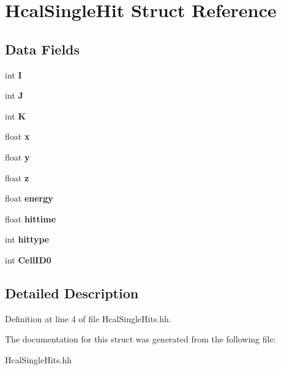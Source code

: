 \section{HcalSingleHit Struct Reference}
\label{structHcalSingleHit}
\subsection*{Data Fields}
\begin{DoxyCompactItemize}
\item 
int {\bfseries I}\label{structHcalSingleHit_ab8c785a4cf4d343ad7e107cbb4ef737d}

\item 
int {\bfseries J}\label{structHcalSingleHit_a28f963e1b6afb63f68b824edf25e171b}

\item 
int {\bfseries K}\label{structHcalSingleHit_acaae346035a5bf06db83b34f0dd794b4}

\item 
float {\bfseries x}\label{structHcalSingleHit_ad7efe549fc3d0edf935f0eff913ab715}

\item 
float {\bfseries y}\label{structHcalSingleHit_a1f42473073dc1eedc9c356118580f8da}

\item 
float {\bfseries z}\label{structHcalSingleHit_a64a006c07bf06ce1fee5666630cfd6d7}

\item 
float {\bfseries energy}\label{structHcalSingleHit_a42b6143ec67442d89723416d5172f868}

\item 
float {\bfseries hittime}\label{structHcalSingleHit_a52d543104083887e9c44257fe4b6b956}

\item 
int {\bfseries hittype}\label{structHcalSingleHit_a09d33f63cd72d0ac0e137d0c0cda298e}

\item 
int {\bfseries CellID0}\label{structHcalSingleHit_aec5d1fcebcf983054bb4de6ae5ba79f8}

\end{DoxyCompactItemize}


\subsection{Detailed Description}


Definition at line 4 of file HcalSingleHits.hh.

The documentation for this struct was generated from the following file:\begin{DoxyCompactItemize}
\item 
HcalSingleHits.hh\end{DoxyCompactItemize}

